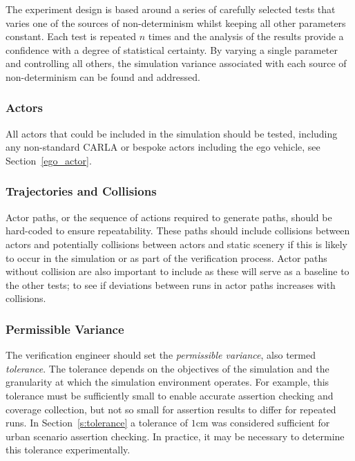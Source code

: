 The experiment design is based around a series of carefully selected tests that varies one of the sources of non-determinism whilst keeping all other parameters constant. Each test is repeated $n$ times and the analysis of the results provide a confidence with a degree of statistical certainty. By varying a single parameter and controlling all others, the simulation variance associated with each source of non-determinism can be found and addressed. 

\subsubsection{Actors} \label{s:actors}

All actors that could be included in the simulation should be tested, including any non-standard CARLA or bespoke actors including the ego vehicle, see Section~\ref{ego_actor}. 

\subsubsection{Trajectories and Collisions} 
Actor paths, or the sequence of actions required to generate paths, should be hard-coded to ensure repeatability. These paths should include collisions between actors and potentially collisions between actors and static scenery if this is likely to occur in the simulation or as part of the verification process. Actor paths without collision are also important to include as these will serve as a baseline to the other tests; to see if deviations between runs in actor paths increases with collisions. 

\subsubsection{Permissible Variance} \label{s:threshold}
The verification engineer should set the \textit{permissible variance}, also termed \textit{tolerance}.
The tolerance depends on the objectives of the simulation and the granularity at which the simulation environment operates. For example, this tolerance must be sufficiently small to enable accurate assertion checking and coverage collection, but not so small for assertion results to differ for repeated runs. In Section~\ref{s:tolerance} a tolerance of $1$cm was considered sufficient for urban scenario assertion checking. In practice, it may be necessary to determine this tolerance experimentally. 

